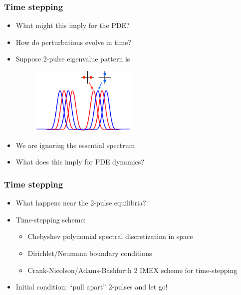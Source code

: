 \documentclass[16pt]{beamer}
\begin{document}
\begin{frame}
	\frametitle{Time stepping}
	\fontsize{14}{7.2}\selectfont
	\begin{itemize}
		\item What might this imply for the PDE?
		\item How do perturbations evolve in time?
		\item Suppose 2-pulse eigenvalue pattern is
		\begin{figure}
		\begin{center}
		\includegraphics[width=5cm]{images/DPeigpattern.eps}
		\end{center}
		\end{figure}
		\item We are ignoring the essential spectrum
		\item What does this imply for PDE dynamics?
	\end{itemize}
\end{frame}

\begin{frame}
	\frametitle{Time stepping}
	\fontsize{14}{7.2}\selectfont
	\begin{itemize}
		\item What happens near the 2-pulse equilibria?
		\vspace{0.5cm}
		\item Time-stepping scheme:
		\begin{itemize}
			\item Chebyshev polynomial spectral discretization in space
			\item Dirichlet/Neumann boundary conditions
			\item Crank-Nicolson/Adams-Bashforth 2 IMEX scheme for time-stepping
		\end{itemize}
		\vspace{0.5cm}
		\item Initial condition: ``pull apart'' 2-pulses and let go!
	\end{itemize}
\end{frame}
\end{document}
